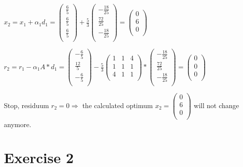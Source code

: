 \documentclass[10pt,DIV10,a4paper]{scrartcl}
\begin{document}
\(x_2=x_1+\alpha _1d_1= \left(
\begin{array}{c}
 \frac{6}{5} \\
 \frac{6}{5} \\
 \frac{6}{5} \\
\end{array}
\right) + \frac{5}{3}\left(
\begin{array}{c}
 -\frac{18}{25} \\
 \frac{72}{25} \\
 -\frac{18}{25} \\
\end{array}
\right)=\left(
\begin{array}{c}
 0 \\
 6 \\
 0 \\
\end{array}
\right)\text{}\)

\(r_2=r_1-\alpha _1 A * d_1= \left(
\begin{array}{c}
 -\frac{6}{5} \\
 \frac{12}{5} \\
 -\frac{6}{5} \\
\end{array}
\right) - \frac{5}{3}\left(
\begin{array}{ccc}
 1 & 1 & 4 \\
 1 & 1 & 1 \\
 4 & 1 & 1 \\
\end{array}
\right) * \left(
\begin{array}{c}
 -\frac{18}{25} \\
 \frac{72}{25} \\
 -\frac{18}{25} \\
\end{array}
\right)=\left(
\begin{array}{c}
 0 \\
 0 \\
 0 \\
\end{array}
\right)\)

Stop, residuum \(r_2=0 \Rightarrow\) the calculated optimum \(x_2=\left(
\begin{array}{c}
 0 \\
 6 \\
 0 \\
\end{array}
\right)\)
will not change anymore.

\section*{Exercise 2}
\end{document}

